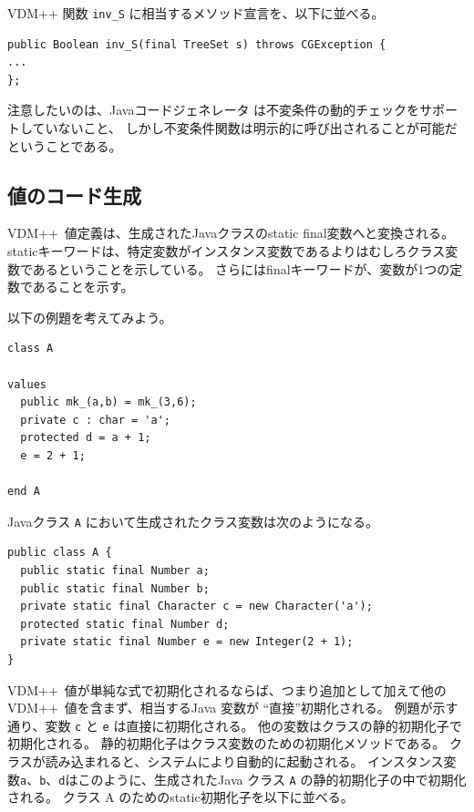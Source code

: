 \documentclass[\pformat,11pt]{jarticle}
\newcommand{\VDM}{VDM++}
\newcommand{\cg}{Javaコードジェネレータ}
\begin{document}
\VDM{} 関数 {\tt inv\_S} に相当するメソッド宣言を、以下に並べる。

\begin{screen}
\begin{verbatim}
public Boolean inv_S(final TreeSet s) throws CGException {
...
};
\end{verbatim}
\end{screen}

注意したいのは、\cg{} は不変条件の動的チェックをサポートしていないこと、
しかし不変条件関数は明示的に呼び出されることが可能だということである。

\subsection{値のコード生成}
\label{values}

\VDM\ 値定義は、生成されたJavaクラスのstatic final変数へと変換される。
staticキーワードは、特定変数がインスタンス変数であるよりはむしろクラス変数であるということを示している。
さらにはfinalキーワードが、変数が1つの定数であることを示す。

以下の例題を考えてみよう。

\begin{screen}
\begin{verbatim}
class A

values
  public mk_(a,b) = mk_(3,6);
  private c : char = 'a';
  protected d = a + 1;
  e = 2 + 1;

end A
\end{verbatim}
\end{screen}

Javaクラス {\tt A} において生成されたクラス変数は次のようになる。

\begin{screen}
\begin{small}
\begin{verbatim}
public class A {
  public static final Number a;
  public static final Number b;
  private static final Character c = new Character('a');
  protected static final Number d;
  private static final Number e = new Integer(2 + 1);
}
\end{verbatim}
\end{small}
\end{screen}

 \VDM\ 値が単純な式で初期化されるならば、つまり追加として加えて他の \VDM\ 値を含まず、相当するJava 変数が ``直接''初期化される。
例題が示す通り、変数 {\tt c} と {\tt e} は直接に初期化される。
他の変数はクラスの静的初期化子で初期化される。
静的初期化子はクラス変数のための初期化メソッドである。
クラスが読み込まれると、システムにより自動的に起動される。
インスタンス変数{\tt a}、{\tt b}、{\tt d}はこのように、生成されたJava クラス {\tt A} の静的初期化子の中で初期化される。
クラス A のためのstatic初期化子を以下に並べる。
\end{document}
